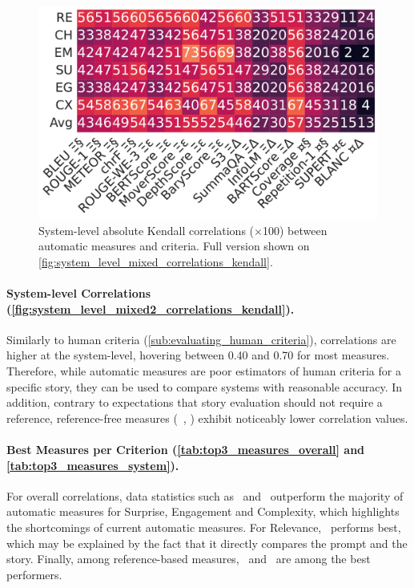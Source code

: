 \begin{figure}[!ht]
\centering
\includegraphics[width=\columnwidth]{pictures/mixed_filtered_system_kendall.pdf}
\caption{System-level absolute Kendall correlations ($\times$100) between automatic measures and criteria. Full version shown on \autoref{fig:system_level_mixed_correlations_kendall}.}
\label{fig:system_level_mixed2_correlations_kendall}
\end{figure}

\paragraph{System-level Correlations (\autoref{fig:system_level_mixed2_correlations_kendall}).}
Similarly to human criteria (\autoref{sub:evaluating_human_criteria}), correlations are higher at the system-level, hovering between 0.40 and 0.70 for most measures. Therefore, while automatic measures are poor estimators of human criteria for a specific story, they can be used to compare systems with reasonable accuracy. In addition, contrary to expectations that story evaluation should not require a reference, reference-free measures (\eg\ \supert, \blanc) exhibit noticeably lower correlation values.

\paragraph{Best Measures per Criterion (\autoref{tab:top3_measures_overall} and \autoref{tab:top3_measures_system}).}
For overall correlations, data statistics such as \tlength\ and \repetition\ outperform the majority of automatic measures for Surprise, Engagement and Complexity, which highlights the shortcomings of current automatic measures. For Relevance, \supert\ performs best, which may be explained by the fact that it directly compares the prompt and the story. Finally, among reference-based measures, \sthree\ and \bertscore\ are among the best performers.

